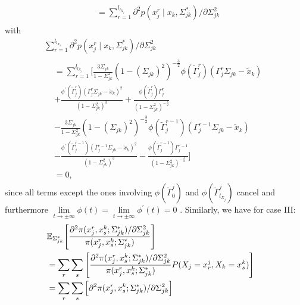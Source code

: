 \begin{condition}
\begin{condition}
\begin{multline*}
\begin{aligned}
                &= \sum_{r=1}^{l_{l_{X_j}}} \partial^2 p(x_j^{r} \mid x_{k}, \Sigma_{jk}^*)/\partial \Sigma_{jk}^{2}
                \end{aligned}
        \end{multline*}
        with 
        \begin{multline*}
                \sum_{r=1}^{l_{l_{X_j}}} \partial^2 p(x_j^{r} \mid x_{k}, \Sigma_{jk}^*)/\partial \Sigma_{jk}^{2}\\
                \begin{aligned}
                &=\sum_{r=1}^{l_{l_{X_j}}} \Bigg[ \frac{3\Sigma_{jk}}{1-\Sigma_{jk}^2} (1-(\Sigma_{jk})^2)^{-\frac{3}{2}} \phi({\tilde{\Gamma}}_j^{r})({\Gamma}_j^r\Sigma_{jk} - {\tilde{x}}_{k}) \\
                &+ \frac{\phi^\prime({\tilde{\Gamma}}_j^{r})({\Gamma}_j^r\Sigma_{jk} - {\tilde{x}}_{k})^2}{(1-\Sigma_{jk}^2)^3} + \frac{\phi({\tilde{\Gamma}}_j^{r}){\Gamma}_j^{r}}{(1-\Sigma_{jk}^2)^{-\frac{3}{2}}} \\
                &- \frac{3\Sigma_{jk}}{1-\Sigma_{jk}^2} (1-(\Sigma_{jk})^2)^{-\frac{3}{2}} \phi({\tilde{\Gamma}}_j^{r-1})({\Gamma}_j^{r-1}\Sigma_{jk} - {\tilde{x}}_{k}) \\
                &- \frac{\phi^\prime({\tilde{\Gamma}}_j^{r-1})({\Gamma}_j^{r-1}\Sigma_{jk} - {\tilde{x}}_{k})^2}{(1-\Sigma_{jk}^2)^3} - \frac{\phi({\tilde{\Gamma}}_j^{r-1}){\Gamma}_j^{r-1}}{(1-\Sigma_{jk}^2)^{-\frac{3}{2}}}\Bigg] \\
                &= 0,
                \end{aligned}
        \end{multline*}
        since all terms except the ones involving $\phi({\tilde{\Gamma}}^j_{0})$ and $\phi({\tilde{\Gamma}}^j_{l_{X_j}})$ cancel and furthermore $ \lim\limits_{t \to \pm \infty} \phi(t) = \lim\limits_{t \to \pm \infty} \phi^\prime(t) = 0$ . Similarly, we have for case III:
        \begin{equation*}
            \begin{split}
                \lefteqn{\mathbb{E}_{\Sigma_{jk}^*}\Bigg[\frac{\partial^2 \pi(x_j^{r},x^k_{s}; \Sigma_{jk}^*)/\partial \Sigma_{jk}^{2}}{\pi(x_j^{r},x^k_{s}; \Sigma_{jk}^*)}\Bigg]} \\
                &= \sum_r \sum_s \Bigg[\frac{\partial^2 \pi(x_j^{r},x^k_{s}; \Sigma_{jk}^*)/\partial \Sigma_{jk}^{2}}{\pi(x_j^{r},x^k_{s}; \Sigma_{jk}^*)} P(X_j = x_r^j, X_k = x_s^k)\Bigg] \\
                &= \sum_r\sum_s \Big[\partial^2 \pi(x_j^{r},x^k_{s}; \Sigma_{jk}^*)/\partial \Sigma_{jk}^{2}\Big] \\

\end{split}
\end{equation*}
\end{condition}
\end{condition}
